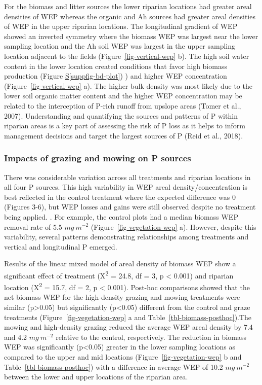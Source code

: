 \documentclass[
]{agujournal2019}
\newcommand*\quartosuppfigref[1]{Figure \hyperref[#1]{S\ref{#1}}}
\begin{document}
For the biomass and litter sources the lower riparian locations had
greater areal densities of WEP whereas the organic and Ah sources had
greater areal densities of WEP in the upper riparian locations. The
longitudinal gradient of WEP showed an inverted symmetry where the
biomass WEP was largest near the lower sampling location and the Ah soil
WEP was largest in the upper sampling location adjacent to the fields
(Figure~\ref{fig-vertical-wep} b). The high soil water content in the
lower location created conditions that favor high biomass production
(\quartosuppfigref{suppfig-bd-plot}) ) and higher WEP concentration
(Figure~\ref{fig-vertical-wep} a). The higher bulk density was most
likely due to the lower soil organic matter content and the higher WEP
concentration may be related to the interception of P-rich runoff from
upslope areas (Tomer et al., 2007). Understanding and quantifying the
sources and patterns of P within riparian areas is a key part of
assessing the risk of P loss as it helps to inform management decisions
and target the largest sources of P (Reid et al., 2018).

\subsubsection{Impacts of grazing and mowing on P
sources}\label{impacts-of-grazing-and-mowing-on-p-sources}

There was considerable variation across all treatments and riparian
locations in all four P sources. This high variability in WEP areal
density/concentration is best reflected in the control treatment where
the expected difference was 0 (Figures 3-6), but WEP losses and gains
were still observed despite no treatment being applied. . For example,
the control plots had a median biomass WEP removal rate of 5.5
\(mg~m^{-2}\) (Figure~\ref{fig-vegetation-wep} a). However, despite this
variability, several patterns demonstrating relationships among
treatments and vertical and longitudinal P emerged.

Results of the linear mixed model of areal density of biomass WEP show a
significant effect of treatment (X\textsuperscript{2} = 24.8, df = 3, p
\textless{} 0.001) and riparian location (X\textsuperscript{2} = 15.7,
df = 2, p \textless{} 0.001). Post-hoc comparisons showed that the net
biomass WEP for the high-density grazing and mowing treatments were
similar (p\textgreater0.05) but significantly (p\textless0.05) different
from the control and graze treatments (Figure~\ref{fig-vegetation-wep} a
and Table~\ref{tbl-biomass-posthoc}).The mowing and high-density grazing
reduced the average WEP areal density by 7.4 and 4.2 \(mg~m^{-2}\)
relative to the control, respectively. The reduction in biomass WEP was
significantly (p\textless0.05) greater in the lower sampling locations
as compared to the upper and mid locations
(Figure~\ref{fig-vegetation-wep} b and Table~\ref{tbl-biomass-posthoc})
with a difference in average WEP of 10.2 \(mg~m^{-2}\) between the lower
and upper locations of the riparian area.
\end{document}
